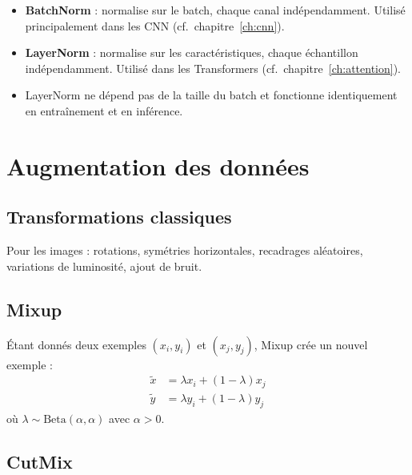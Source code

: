 \begin{remarque}
\begin{itemize}
  \item \textbf{BatchNorm} : normalise sur le batch, chaque canal ind\'ependamment.
    Utilis\'e principalement dans les CNN (cf.\ chapitre~\ref{ch:cnn}).
  \item \textbf{LayerNorm} : normalise sur les caract\'eristiques, chaque
    \'echantillon ind\'ependamment. Utilis\'e dans les Transformers
    (cf.\ chapitre~\ref{ch:attention}).
  \item LayerNorm ne d\'epend pas de la taille du batch et fonctionne
    identiquement en entra\^inement et en inf\'erence.
\end{itemize}
\end{remarque}

\section{Augmentation des donn\'ees}
\label{sec:data-augmentation}

\subsection{Transformations classiques}

Pour les images : rotations, sym\'etries horizontales, recadrages al\'eatoires,
variations de luminosit\'e, ajout de bruit.

\subsection{Mixup}

\begin{formules}[title=\textbf{Mixup}]
\'Etant donn\'es deux exemples $(x_i, y_i)$ et $(x_j, y_j)$, Mixup
\cite{zhang2018mixup} cr\'ee un nouvel exemple :
\begin{align}
\tilde{x} &= \lambda x_i + (1 - \lambda) x_j \\
\tilde{y} &= \lambda y_i + (1 - \lambda) y_j
\end{align}
o\`u $\lambda \sim \text{Beta}(\alpha, \alpha)$ avec $\alpha > 0$.
\end{formules}

\subsection{CutMix}

